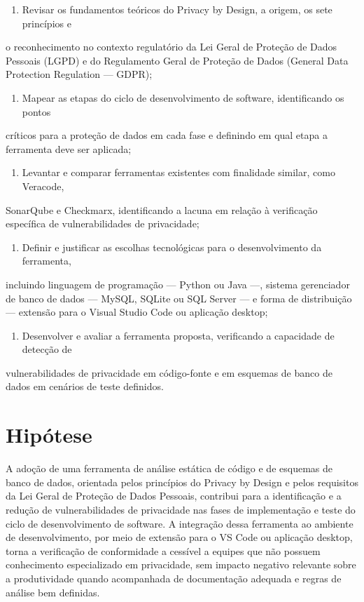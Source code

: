 \documentclass[oneside]{normas-utf-tex}
\begin{document}
\begin{enumerate}
\item Revisar os fundamentos teóricos do Privacy by Design, a origem, os sete princípios e
\end{enumerate}

o reconhecimento no contexto regulatório da Lei Geral de Proteção de Dados Pessoais (LGPD) e do Regulamento Geral de Proteção de Dados (General Data Protection Regulation — GDPR);

\begin{enumerate}
\item Mapear as etapas do ciclo de desenvolvimento de software, identificando os pontos
\end{enumerate}

críticos para a proteção de dados em cada fase e definindo em qual etapa a ferramenta deve ser aplicada;

\begin{enumerate}
\item Levantar e comparar ferramentas existentes com finalidade similar, como Veracode,
\end{enumerate}

SonarQube e Checkmarx, identificando a lacuna em relação à verificação específica de vulnerabilidades de privacidade;

\begin{enumerate}
\item Definir e justificar as escolhas tecnológicas para o desenvolvimento da ferramenta,
\end{enumerate}

incluindo linguagem de programação — Python ou Java —, sistema gerenciador de banco de dados — MySQL, SQLite ou SQL Server — e forma de distribuição — extensão para o Visual Studio Code ou aplicação desktop;

\begin{enumerate}
\item Desenvolver e avaliar a ferramenta proposta, verificando a capacidade de detecção de
\end{enumerate}

vulnerabilidades de privacidade em código-fonte e em esquemas de banco de dados em cenários de teste definidos.

\section{Hipótese}

A adoção de uma ferramenta de análise estática de código e de esquemas de banco de dados, orientada pelos princípios do Privacy by Design e pelos requisitos da Lei Geral de Proteção de Dados Pessoais, contribui para a identificação e a redução de vulnerabilidades de privacidade nas fases de implementação e teste do ciclo de desenvolvimento de software. A integração dessa ferramenta ao ambiente de desenvolvimento, por meio de extensão para o VS Code ou aplicação desktop, torna a verificação de conformidade a cessível a equipes que não possuem conhecimento especializado em privacidade, sem impacto negativo relevante sobre a produtividade quando acompanhada de documentação adequada e regras de análise bem definidas.
\end{document}
